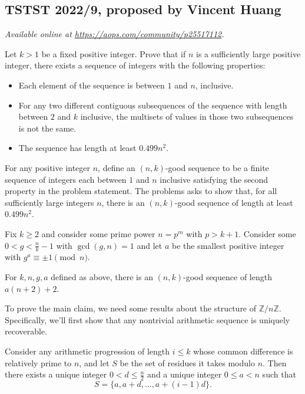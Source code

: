 \documentclass[11pt]{scrartcl}
\begin{document}
\subsection{TSTST 2022/9, proposed by Vincent Huang}
\textsl{Available online at \url{https://aops.com/community/p25517112}.}
\begin{mdframed}[style=mdpurplebox,frametitle={Problem statement}]
Let $k > 1$ be a fixed positive integer.
Prove that if $n$ is a sufficiently large positive integer,
there exists a sequence of integers with the following properties:
\begin{itemize}
  \item Each element of the sequence is between $1$ and $n$, inclusive.
  \item For any two different contiguous subsequences of the sequence with
    length between $2$ and $k$ inclusive,
    the multisets of values in those two subsequences is not the same.
  \item The sequence has length at least $0.499n^2$.
\end{itemize}
\end{mdframed}
For any positive integer $n$,
define an $(n,k)$-good sequence to be a finite sequence of integers
each between $1$ and $n$ inclusive satisfying the
second property in the problem statement.
The problems asks to show that,
for all sufficiently large integers $n$,
there is an $(n,k)$-good sequence of length at least $0.499n^2$.

Fix $k\ge 2$ and consider some prime power $n=p^m$ with $p>k+1$. Consider some $0 < g < \frac{n}{k}-1$ with $\gcd (g, n)=1$ and let $a$ be the smallest positive integer with $g^a \equiv \pm 1\pmod n$.

\begin{claim*}
  For $k,n,g,a$ defined as above,
  there is an $(n,k)$-good sequence of length $a(n+2)+2$.
\end{claim*}

To prove the main claim,
we need some results about the structure of $\mathbb Z / n\mathbb Z$.
Specifically, we'll first show that any nontrivial arithmetic sequence
is uniquely recoverable.

\begin{lemma*}
  Consider any arithmetic progression of length $i\le k$ whose common difference is relatively prime to $n$, and let $S$ be the set of residues it takes modulo $n$. Then there exists a unique integer $0 < d \le \frac{n}{2}$ and a unique integer $0 \le a < n$ such that \[S = \{ a, a+d, \dots, a+(i-1)d\}.\]
\end{lemma*}
\end{document}
